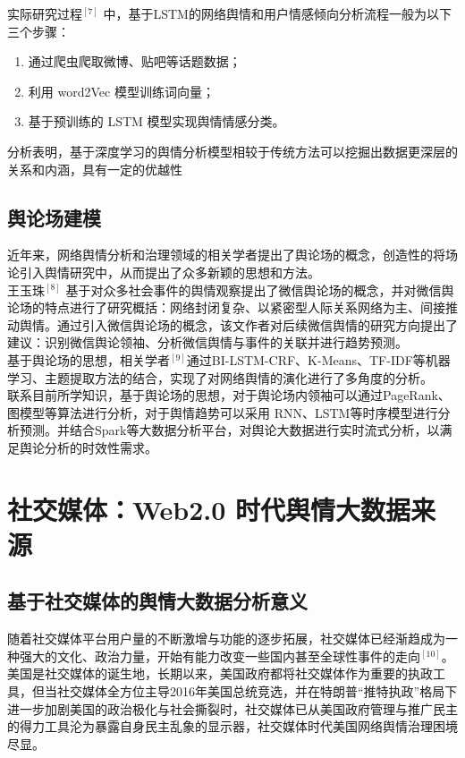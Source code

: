 \documentclass[11pt,a4paper,utf8]{article}
\begin{document}
实际研究过程$^{[7]}$ 中，基于LSTM的网络舆情和用户情感倾向分析流程一般为以下三个步骤：
\begin{enumerate}
\item 通过爬虫爬取微博、贴吧等话题数据；
\item 利用 word2Vec 模型训练词向量；
\item 基于预训练的 LSTM 模型实现舆情情感分类。
\end{enumerate} 

分析表明，基于深度学习的舆情分析模型相较于传统方法可以挖掘出数据更深层的关系和内涵，具有一定的优越性

\subsection{舆论场建模}
近年来，网络舆情分析和治理领域的相关学者提出了舆论场的概念，创造性的将场论引入舆情研究中，从而提出了众多新颖的思想和方法。\\

王玉珠$^{[8]}$ 基于对众多社会事件的舆情观察提出了微信舆论场的概念，并对微信舆论场的特点进行了研究概括：网络封闭复杂、以紧密型人际关系网络为主、间接推动舆情。通过引入微信舆论场的概念，该文作者对后续微信舆情的研究方向提出了建议：识别微信舆论领袖、分析微信舆情与事件的关联并进行趋势预测。\\

基于舆论场的思想，相关学者$^{[9]}$通过BI-LSTM-CRF、K-Means、TF-IDF等机器学习、主题提取方法的结合，实现了对网络舆情的演化进行了多角度的分析。\\

联系目前所学知识，基于舆论场的思想，对于舆论场内领袖可以通过PageRank、图模型等算法进行分析，对于舆情趋势可以采用 RNN、LSTM等时序模型进行分析预测。并结合Spark等大数据分析平台，对舆论大数据进行实时流式分析，以满足舆论分析的时效性需求。\\

\section{社交媒体：Web2.0 时代舆情大数据来源}

{\color{red}{以下部分由窦浩阳书写整理}} 
\subsection{基于社交媒体的舆情大数据分析意义}

随着社交媒体平台用户量的不断激增与功能的逐步拓展，社交媒体已经渐趋成为一种强大的文化、政治力量，开始有能力改变一些国内甚至全球性事件的走向$^{[10]}$。美国是社交媒体的诞生地，长期以来，美国政府都将社交媒体作为重要的执政工具，但当社交媒体全方位主导2016年美国总统竞选，并在特朗普“推特执政”格局下进一步加剧美国的政治极化与社会撕裂时，社交媒体已从美国政府管理与推广民主的得力工具沦为暴露自身民主乱象的显示器，社交媒体时代美国网络舆情治理困境尽显。\\
\end{document}
